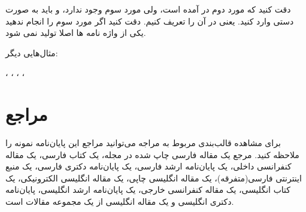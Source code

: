 دقت کنید که مورد دوم در {}  آمده است، ولی مورد سوم وجود ندارد، و باید به صورت دستی وارد کنید. یعنی در  {} آن را تعریف کنیم. دقت کنید اگر مورد سوم را انجام ندهید یکی از واژه نامه ها اصلا تولید نمی شود. 

مثال‌هایی دیگر:


،
،
،
،


\section{مراجع}
برای مشاهده قالب‌بندی مربوط به مراجه می‌توانید مراجع این پایان‌نامه نمونه را ملاحظه کنید.
مرجع \cite{1} یک مقاله فارسی چاپ شده در مجله، \cite{2} یک کتاب فارسی، \cite{3} یک مقاله کنفرانسی داخلی، \cite{4} یک پایان‌نامه ارشد فارسی، \cite{5}  یک پایان‌نامه دکتری فارسی، \cite{6} یک منبع اینترنتی فارسی(متفرقه)،  \cite{7} یک مقاله انگلیسی چاپی، \cite{8} یک مقاله انگلیسی الکترونیکی، \cite{9} یک کتاب انگلیسی، \cite{10} یک مقاله کنفرانسی خارجی، \cite{11} یک پایان‌نامه ارشد انگلیسی، \cite{12} پایان‌نامه دکتری انگلیسی و \cite{13} یک مقاله انگلیسی از یک مجموعه مقالات  است.



